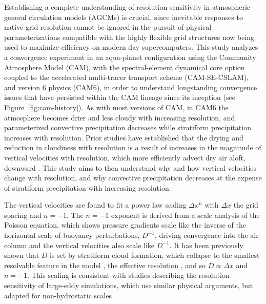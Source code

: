 \documentclass[times]{qjrms4}
\begin{document}
Establishing a complete understanding of resolution sensitivity in atmospheric general circulation models (AGCMs) is crucial, since inevitable responses to native grid resolution cannot be ignored in the pursuit of physical parameterizations compatible with the highly flexible grid structures now being used to maximize efficiency on modern day supercomputers. This study analyzes a convergence experiment in an aqua-planet configuration using the Community Atmosphere Model (CAM), with the spectral-element dynamical core option coupled to the accelerated multi-tracer transport scheme (CAM-SE-CSLAM), and version 6 physics (CAM6), in order to understand longstanding convergence issues that have persisted within the CAM lineage since its inception (see Figure~\ref{fig:cam-history}). As with most versions of CAM, in CAM6 the atmosphere becomes drier and less cloudy with increasing resolution, and parameterized convective precipitation decreases while stratiform precipitation increases with resolution. Prior studies have established that the drying and reduction in cloudiness with resolution is a result of increases in the magnitude of vertical velocities with resolution, which more efficiently advect dry air aloft, downward \citep{KW1991JGR,WETAL1995CD,YETAL2014JCLIM,HR2017JCLIM}. This study aims to then understand why and how vertical velocities change with resolution, and why convective precipitation decreases at the expense of stratiform precipitation with increasing resolution.

The vertical velocities are found to fit a power law scaling $\Delta x^n$ with $\Delta x$ the grid spacing and $n=-1$. The $n=-1$ exponent is derived from a scale analysis of the Poisson equation, which shows pressure gradients scale like the inverse of the horizontal scale of buoyancy perturbations, $D^{-1}$, driving convergence into the air column and the vertical velocities also scale like $D^{-1}$. It has been previously shown that $D$ is set by stratiform cloud formation, which collapse to the smallest resolvable feature in the model \citep{HR2018JAMES}, the effective resolution \citep{S2011LNCSE}, and so $D \propto \Delta x$ and $n=-1$. This scaling is consistent with studies describing the resolution sensitivity of large-eddy simulations, which use similar physical arguments, but adapted for non-hydrostatic scales \citep{WETAL1997MWR,PG2006JAS,JR2016QJRMS}.
\end{document}
